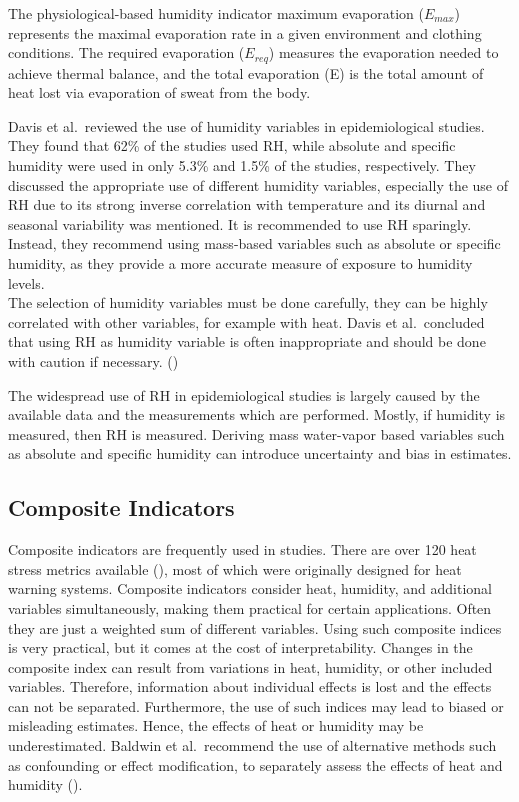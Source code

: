 \documentclass[
]{krantz}
\begin{document}
The physiological-based humidity indicator maximum evaporation (\(E_{max}\)) represents the maximal evaporation rate in a given environment and clothing conditions. The required evaporation (\(E_{req}\)) measures the evaporation needed to achieve thermal balance, and the total evaporation (E) is the total amount of heat lost via evaporation of sweat from the body.

Davis et al.~reviewed the use of humidity variables in epidemiological studies. They found that 62\% of the studies used RH, while absolute and specific humidity were used in only 5.3\% and 1.5\% of the studies, respectively. They discussed the appropriate use of different humidity variables, especially the use of RH due to its strong inverse correlation with temperature and its diurnal and seasonal variability was mentioned. It is recommended to use RH sparingly. Instead, they recommend using mass-based variables such as absolute or specific humidity, as they provide a more accurate measure of exposure to humidity levels.\\
The selection of humidity variables must be done carefully, they can be highly correlated with other variables, for example with heat. Davis et al.~concluded that using RH as humidity variable is often inappropriate and should be done with caution if necessary. (\citet{davis2016})

The widespread use of RH in epidemiological studies is largely caused by the available data and the measurements which are performed. Mostly, if humidity is measured, then RH is measured. Deriving mass water-vapor based variables such as absolute and specific humidity can introduce uncertainty and bias in estimates.

\subsection{Composite Indicators}\label{composite-indicators}

Composite indicators are frequently used in studies. There are over 120 heat stress metrics available (\citet{buzan2020}), most of which were originally designed for heat warning systems. Composite indicators consider heat, humidity, and additional variables simultaneously, making them practical for certain applications. Often they are just a weighted sum of different variables. Using such composite indices is very practical, but it comes at the cost of interpretability. Changes in the composite index can result from variations in heat, humidity, or other included variables. Therefore, information about individual effects is lost and the effects can not be separated. Furthermore, the use of such indices may lead to biased or misleading estimates. Hence, the effects of heat or humidity may be underestimated. Baldwin et al.~recommend the use of alternative methods such as confounding or effect modification, to separately assess the effects of heat and humidity (\citet{baldwin2023}).
\end{document}
